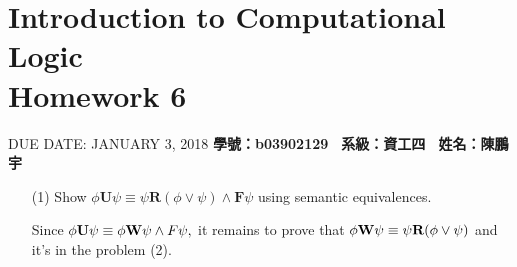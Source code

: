 \documentclass{article}
\begin{document}
\section*{Introduction to Computational Logic \\ \normalsize{Homework 6}}
\normalsize{DUE DATE: JANUARY 3, 2018} \hfill \textbf{學號：b03902129 \, 系級：資工四 \, 姓名：陳鵬宇} \\

\begin{enumerate}
    \item [(1)] Show $\phi\textbf{U}\psi\equiv\psi\textbf{R}(\phi\lor\psi)\land\textbf{F}\psi$ using semantic equivalences.
    
    Since $\phi\textbf U\psi\equiv\phi\textbf W\psi\land F\psi,$ it remains to prove that $\phi\textbf W\psi\equiv\psi\textbf{R}(\phi\lor\psi)$ and it's in the problem (2).


\end{enumerate}
\end{document}

